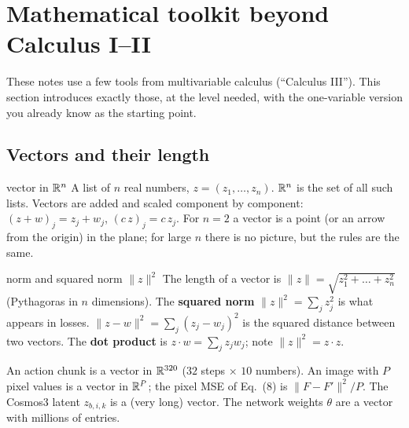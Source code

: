 \section{Mathematical toolkit beyond Calculus I--II}\label{fpo:sec:toolkit}
These notes use a few tools from multivariable calculus (``Calculus III''). This section introduces exactly those, at the level needed, with the one-variable version you already know as the starting point.

\subsection{Vectors and their length}
\begin{newc}{vector in $\mathbb{R}^n$}
A list of $n$ real numbers, $z=(z_1,\dots,z_n)$. $\mathbb{R}^n$ is the set of all such lists. Vectors are added and scaled component by component: $(z+w)_j=z_j+w_j$, $(c\,z)_j=c\,z_j$. For $n=2$ a vector is a point (or an arrow from the origin) in the plane; for large $n$ there is no picture, but the rules are the same.
\end{newc}
\begin{newc}{norm and squared norm $\|z\|^2$}
The length of a vector is $\|z\|=\sqrt{z_1^2+\dots+z_n^2}$ (Pythagoras in $n$ dimensions). The \textbf{squared norm} $\|z\|^2=\sum_jz_j^2$ is what appears in losses. $\|z-w\|^2=\sum_j(z_j-w_j)^2$ is the squared distance between two vectors. The \textbf{dot product} is $z\cdot w=\sum_jz_jw_j$; note $\|z\|^2=z\cdot z$.
\end{newc}
\begin{paperlink}
An action chunk is a vector in $\mathbb{R}^{320}$ ($32$ steps $\times$ $10$ numbers). An image with $P$ pixel values is a vector in $\mathbb{R}^P$; the pixel MSE of Eq.~(8) is $\|F-F'\|^2/P$. The Cosmos3 latent $z_{b,i,k}$ is a (very long) vector. The network weights $\theta$ are a vector with millions of entries.
\end{paperlink}

